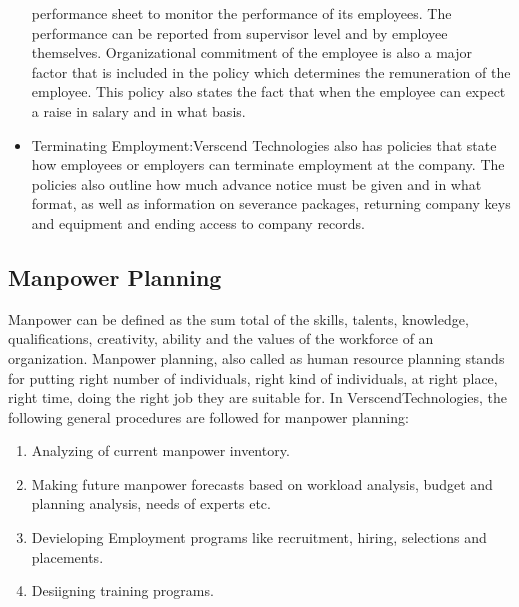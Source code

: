 \begin{itemize}
performance sheet to monitor the performance of its employees. The performance can be reported from
supervisor level and by employee themselves. Organizational commitment of the employee is also a
major factor that is included in the policy which determines the remuneration of the employee. This
policy also states the fact that when the employee can expect a raise in salary and in what basis.
\item Terminating Employment:Verscend Technologies also has policies that state how
employees or employers can terminate employment at the company. The policies also outline how
much advance notice must be given and in what format, as well as information on severance packages,
returning company keys and equipment and ending access to company records.
\end{itemize}
\subsection{Manpower Planning}
Manpower can be defined as the sum total of the skills, talents, knowledge, qualifications, creativity, ability
and the values of the workforce of an organization. Manpower planning, also called as human resource
planning stands for putting right number of individuals, right kind of individuals, at right place, right time,
doing the right job they are suitable for.
In VerscendTechnologies, the following general procedures are followed for manpower planning:
\begin{enumerate}
\item
 Analyzing of current manpower inventory.
\item
 Making future manpower forecasts based on workload analysis, budget and planning analysis, needs
of experts etc.
\item
 Devieloping Employment programs like recruitment, hiring, selections and placements.
\item
 Desiigning training programs.
\end{enumerate}
